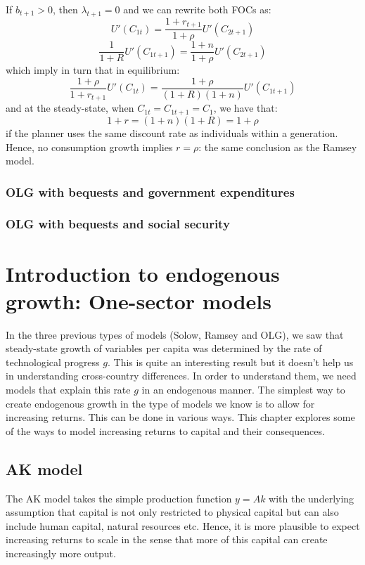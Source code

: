 \documentclass[12pt]{report}
\begin{document}
If $b_{t+1} > 0$, then $\lambda_{t+1} = 0$ and we can rewrite both FOCs as: $$U'(C_{1t}) = \frac{1+r_{t+1}}{1+\rho} U'(C_{2t+1}) $$ $$\frac{1}{1+R} U'(C_{1t+1}) = \frac{1+n}{1+\rho}U'(C_{2t+1}) $$ which imply in turn that in equilibrium: $$ \frac{1+\rho}{1+r_{t+1}} U'(C_{1t}) = \frac{1 + \rho}{(1+R)(1+n)} U'(C_{1t+1}) $$ and at the steady-state, when $C_{1t} = C_{1t+1} = C_1$, we have that: $$ 1 + r = (1 + n)(1 + R) = 1 + \rho$$ if the planner uses the same discount rate as individuals within a generation. Hence, no consumption growth implies $r = \rho$: the same conclusion as the Ramsey model.

\subsection{OLG with bequests and government expenditures}



\subsection{OLG with bequests and social security}




\chapter{Introduction to endogenous growth: One-sector models}

In the three previous types of models (Solow, Ramsey and OLG), we saw that steady-state growth of variables per capita was determined by the rate of technological progress $g$. This is quite an interesting result but it doesn't help us in understanding cross-country differences. In order to understand them, we need models that explain this rate $g$ in an endogenous manner. The simplest way to create endogenous growth in the type of models we know is to allow for increasing returns. This can be done in various ways. This chapter explores some of the ways to model increasing returns to capital and their consequences.

\section{AK model}

The AK model takes the simple production function $y = Ak$ with the underlying assumption that capital is not only restricted to physical capital but can also include human capital, natural resources etc. Hence, it is more plausible to expect increasing returns to scale in the sense that more of this capital can create increasingly more output.
\end{document}
